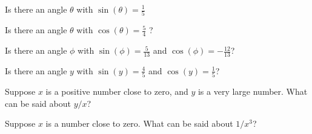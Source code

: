 \documentclass{ximera}
\newcommand{\recommendation}[1]{}
\begin{document}
\begin{shuffle}
\begin{problem}
  Is there an angle $\theta$ with $\sin(\theta) = \frac{1}{5}$
  \begin{multipleChoice}
  \end{multipleChoice}
\end{problem}

\begin{problem}
  Is there an angle $\theta$ with $\cos(\theta) = \frac{5}{4}$ ?
  \begin{multipleChoice}
  \end{multipleChoice}
\end{problem}

\begin{problem}
  Is there an angle $\phi$ with $\sin(\phi) = \frac{5}{13}$ and $\cos(\phi) = -\frac{12}{13}$?
  \begin{multipleChoice}
  \end{multipleChoice}
\end{problem}

\begin{problem}
  Is there an angle $y$ with $\sin(y) = \frac{4}{5}$ and $\cos(y) = \frac{1}{5}$?
  \begin{multipleChoice}
  \end{multipleChoice}
\end{problem}


\begin{problem}
  Suppose $x$ is a positive number close to zero, and $y$ is a very large number.  What can be said about $y/x$?
  \begin{multipleChoice}
  \end{multipleChoice}
\end{problem}

\begin{problem}
  Suppose $x$ is a number close to zero.  What can be said about $1/x^3$?
  \begin{multipleChoice}
  \end{multipleChoice}
\end{problem}


\end{shuffle}
\end{document}
